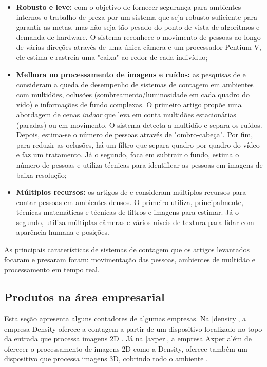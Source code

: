 \begin{itemize}
  \item \textbf{Robusto e leve:} com o objetivo de fornecer segurança para ambientes internos
  o trabalho de  preza por um sistema que seja robusto suficiente para garantir as metas, mas
  não seja tão pesado do ponto de vista de algoritmos e demanda de hardware. O sistema reconhece o movimento de pessoas
  ao longo de várias direções através de uma única câmera e um processador Pentium V, ele estima e rastreia uma "caixa" ao redor de cada indivíduo;
  \item \textbf{Melhora no processamento de imagens e ruídos:} as pesquisas de  e  consideram
  a queda de desempenho de sistemas de contagem em ambientes com multidões, oclusões (sombreamento/luminosidade
  em cada quadro do vído) e informações de fundo complexas. O primeiro artigo propõe uma abordagem de cenas \emph{indoor}
  que leva em conta multidões estacionárias (paradas) ou em movimento. O sistema detecta a multidão e separa
  os ruídos. Depois, estima-se o número de pessoas através de "ombro-cabeça". Por fim, para reduzir as oclusões,
  há um filtro que separa quadro por quadro do vídeo e faz um tratamento. Já o segundo, foca em subtrair o fundo, estima
  o número de pessoas e utiliza técnicas para identificar as pessoas em imagens de baixa resolução;
  \item \textbf{Múltiplos recursos:} os artigos de  e  consideram múltiplos recursos para contar pessoas
  em ambientes densos. O primeiro utiliza, principalmente, técnicas matemáticas e técnicas de filtros e imagens para estimar. Já o segundo, utiliza
  múltiplas câmeras e vários níveis de textura para lidar com aparência humana e posições.

\end{itemize}

  As principais caraterísticas de sistemas de contagem que os artigos levantados focaram e presaram foram: movimentação das pessoas,
  ambientes de multidão e processamento em tempo real.

\subsection{Produtos na área empresarial}
Esta seção apresenta alguns contadores de algumas empresas. Na \autoref{density}, a empresa Density oferece a contagem a partir de um
dispositivo localizado no topo da entrada que processa imagens 2D \cite{Density2017}. Já na \autoref{axper}, a empresa Axper além de oferecer
o processamento de imagens 2D como a Density, oferece também um dispositivo que processa imagens 3D, cobrindo todo o ambiente \cite{Axper2017}.

